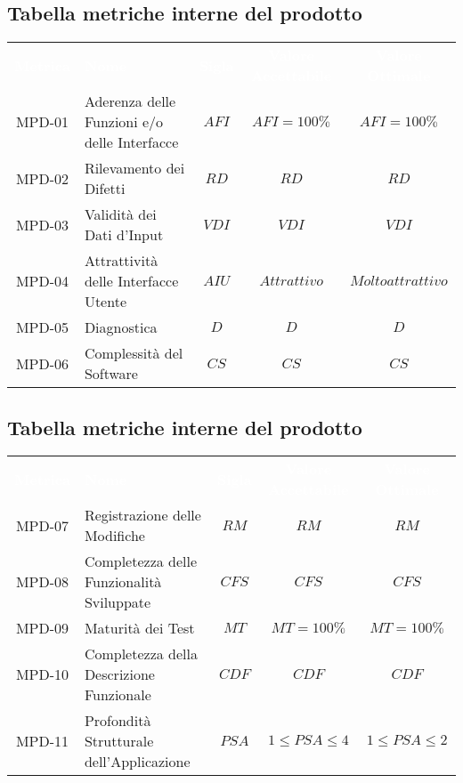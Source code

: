\subsection{Tabella metriche interne del prodotto}
    \renewcommand{\arraystretch}{1.5}
    \begin{longtable}{ c C{4cm} c c c}
    \textcolor{white}{\textbf{Metrica}} & \textcolor{white}{\textbf{Nome}} & \textcolor{white}{\textbf{Sigla}} & \textcolor{white}{\textbf{Valore Accettabile}} & \textcolor{white}{\textbf{Valore Ottimale}}\\
    MPD-01 & Aderenza delle Funzioni e/o delle Interfacce & $AFI$ & $AFI=100\%$ & $AFI=100\%$ \\
    MPD-02 & Rilevamento dei Difetti & $RD$ & $ RD $ & $RD$ \\
    MPD-03 & Validità dei Dati d'Input & $VDI$ &  $VDI $ &  $VDI$ \\
    MPD-04 & Attrattività delle Interfacce Utente & $AIU$ & $Attrattivo$ &  $Molto attrattivo$ \\
    MPD-05 & Diagnostica & $D$ & $D $ & $D $ \\
    MPD-06 & Complessità del Software & $CS$ & $CS$ & $CS$ \\
    \end{longtable} 

\newpage %

\subsection{Tabella metriche interne del prodotto}
    \renewcommand{\arraystretch}{1.5}
    \begin{longtable}{ c C{4cm} c c c}
    \textcolor{white}{\textbf{Metrica}} & \textcolor{white}{\textbf{Nome}} & \textcolor{white}{\textbf{Sigla}} & \textcolor{white}{\textbf{Valore Accettabile}} & \textcolor{white}{\textbf{Valore Ottimale}}\\
    MPD-07 & Registrazione delle Modifiche & $RM$ & $RM$ & $RM$ \\
    MPD-08 & Completezza delle Funzionalità Sviluppate & $CFS$ & $CFS$ & $CFS$  \\
    MPD-09 & Maturità dei Test & $MT$ & $MT=100\% $ & $MT=100\%$  \\	
    MPD-10 & Completezza della Descrizione Funzionale & $CDF$ & $CDF$ & $CDF$  \\
    MPD-11 &  Profondità Strutturale dell'Applicazione & $PSA$ & $1 \leq PSA \leq 4$ &$1 \leq PSA \leq 2$  \\
    \end{longtable}  
                
       
                 
       
       
